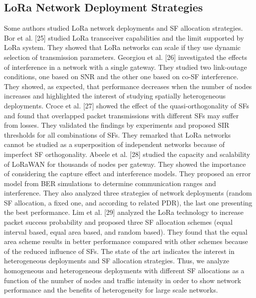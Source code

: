 \subsection{LoRa Network Deployment Strategies}
Some authors studied LoRa network deployments and SF allocation strategies.
Bor et al.
[25] studied LoRa transceiver capabilities and the limit supported by LoRa system.
They showed that LoRa networks can scale if they use dynamic selection of transmission parameters.
Georgiou et al.
[26] investigated the effects of interference in a network with a single gateway.
They studied two link-outage conditions,
	one based on SNR and the other one based on co-SF interference.
They showed,
	as expected,
	that performance decreases when the number of nodes increases and highlighted the interest of studying spatially heterogeneous deployments.
Croce et al.
[27] showed the effect of the quasi-orthogonality of SFs and found that overlapped packet transmissions with different SFs may suffer from losses.
They validated the findings by experiments and proposed SIR thresholds for all combinations of SFs.
They remarked that LoRa networks cannot be studied as a superposition of independent networks because of imperfect SF orthogonality.
Abeele et al.
[28] studied the capacity and scalability of LoRaWAN for thousands of nodes per gateway.
They showed the importance of considering the capture effect and interference models.
They proposed an error model from BER simulations to determine communication ranges and interference.
They also analyzed three strategies of network deployments (random SF allocation,
	a fixed one,
	and according to related PDR),
	the last one presenting the best performance.
Lim et al.
[29] analyzed the LoRa technology to increase packet success probability and proposed three SF allocation schemes (equal interval based,
	equal area based,
	and random based).
They found that the equal area scheme results in better performance compared with other schemes because of the reduced influence of SFs.
The state of the art indicates the interest in heterogeneous deployments and SF allocation strategies.
Thus,
	we analyze homogeneous and heterogeneous deployments with different SF allocations as a function of the number of nodes and traffic intensity in order to show network performance and the benefits of heterogeneity for large scale networks.







